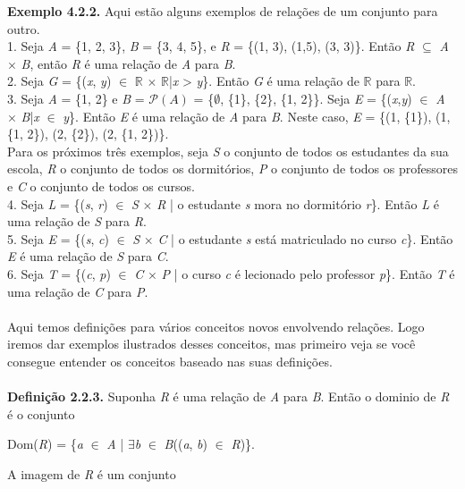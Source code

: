 \textbf{Exemplo 4.2.2.} Aqui estão alguns exemplos de relações de um conjunto para outro.
\\
1. Seja \textit{A} = \{1, 2, 3\}, \textit{B} = \{3, 4, 5\}, e \textit{R} = \{(1, 3), (1,5), (3, 3)\}. Então \textit{R} $\subseteq$ 
\textit{A} $\times$ \textit{B}, então \textit{R} é uma relação de \textit{A} para \textit{B}.
\\
2. Seja \textit{G} = \{(\textit{x}, \textit{y}) $\in$ $\mathbb{R}$ $\times$ $\mathbb{R}$|\textit{x} > \textit{y}\}. Então \textit{G}
é uma relação de $\mathbb{R}$ para $\mathbb{R}$.
\\
3. Seja \textit{A} = \{1, 2\} e \textit{B} = $\mathcal P(A)$ = \{$\emptyset$, \{1\}, \{2\}, \{1, 2\}\}. Seja \textit{E} = 
\{(\textit{x},\textit{y}) $\in$ \textit{A} $\times$ \textit{B}|\textit{x} $\in$ \textit{y}\}. Então \textit{E} é uma relação de 
\textit{A} para \textit{B}. Neste caso, \textit{E} = \{(1, \{1\}), (1, \{1, 2\}), (2, \{2\}), (2, \{1, 2\})\}.
\\
Para os próximos três exemplos, seja \textit{S} o conjunto de todos os estudantes da sua escola, \textit{R} o conjunto de todos os
dormitórios, \textit{P} o conjunto de todos os professores e \textit{C} o conjunto de todos os cursos.
\\
4. Seja \textit{L} = \{(\textit{s}, \textit{r}) $\in$ \textit{S} $\times$ \textit{R} | o estudante \textit{s} mora no dormitório 
\textit{r}\}. Então \textit{L} é uma relação de \textit{S} para \textit{R}.
\\
5. Seja \textit{E} = \{(\textit{s}, \textit{c}) $\in$ \textit{S} $\times$ \textit{C} | o estudante \textit{s} está matriculado no 
curso \textit{c}\}. Então \textit{E} é uma relação de \textit{S} para \textit{C}.
\\
6. Seja \textit{T} = \{(\textit{c}, \textit{p}) $\in$ \textit{C} $\times$ \textit{P} | o curso \textit{c} é lecionado pelo professor
\textit{p}\}. Então \textit{T} é uma relação de \textit{C} para \textit{P}.
\\
\\
Aqui temos definições para vários conceitos novos envolvendo relações. Logo iremos dar exemplos ilustrados desses conceitos,
mas primeiro veja se você consegue entender os conceitos baseado nas suas definições.
\\
\\
\textbf{Definição 2.2.3.} Suponha \textit{R} é uma relação de \textit{A} para \textit{B}. Então o dominio de \textit{R} é o
conjunto

\begin{center}
Dom(\textit{R}) = \{\textit{a} $\in$ \textit{A} | $\exists$\textit{b} $\in$ \textit{B}((\textit{a}, \textit{b}) $\in$ \textit{R})\}. 
\end{center}
A imagem de \textit{R} é um conjunto

